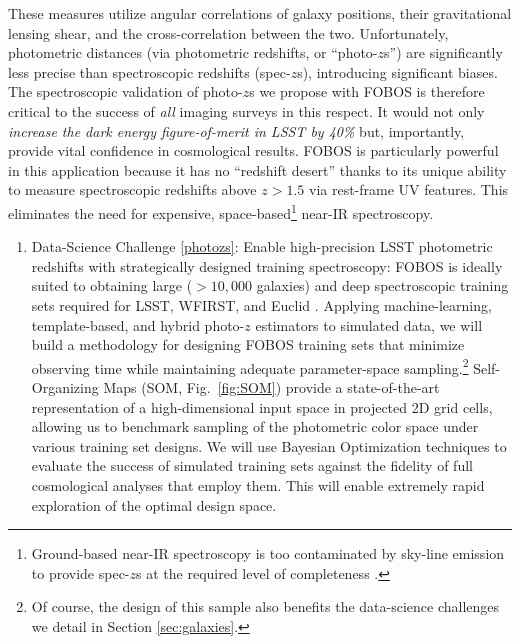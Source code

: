\documentclass[oneside,11pt]{amsart}
\newcounter{chalno}
\newcommand{\chal}[1]{\refstepcounter{chalno}\label{#1}}
\begin{document}
These measures utilize angular correlations of galaxy positions, their
gravitational lensing shear, and the cross-correlation between the two.
Unfortunately, photometric distances (via photometric redshifts, or
``photo-$z$s'') are significantly less precise than spectroscopic
redshifts (spec-$z$s), introducing significant biases.  The
spectroscopic validation of photo-$z$s we propose with FOBOS is
therefore critical to the success of {\it all} imaging surveys in this
respect. It would not only \emph{increase the dark energy
figure-of-merit in LSST by 40\%} \citep{newman15} but, importantly,
provide vital confidence in cosmological results.  FOBOS is particularly
powerful in this application because it has no ``redshift desert'' thanks to its unique ability to measure spectroscopic redshifts above $z > 1.5$ via
rest-frame UV features.  This eliminates the need for expensive, space-based\footnote{Ground-based near-IR
spectroscopy is too contaminated by sky-line emission to provide spec-$z$s at the required level of completeness
\citep{newman15}.} near-IR spectroscopy.

\chal{photozs}
%
\begin{enumerate}[rightmargin=0.2cm,leftmargin=0.2cm]
%
\item[] {\textsf {\large Data-Science Challenge \ref{photozs}: Enable
high-precision LSST photometric redshifts with strategically designed
training spectroscopy:}}  FOBOS is ideally suited to obtaining large
($>10,000$ galaxies) and deep spectroscopic training sets required for
LSST, WFIRST, and Euclid \citep[see][] {newman15}.  Applying
machine-learning, template-based, and hybrid photo-$z$ estimators to
simulated data, we will build a methodology for designing FOBOS training
sets that minimize observing time while maintaining adequate
parameter-space sampling.\footnote{
%
Of course, the design of this sample also benefits the data-science
challenges we detail in Section \ref{sec:galaxies}.}
%
Self-Organizing Maps (SOM, Fig.~\ref {fig:SOM}) provide a
state-of-the-art representation of a high-dimensional input space in
projected 2D grid cells, allowing us to benchmark sampling of the
photometric color space under various training set designs.  We will use
Bayesian Optimization techniques to evaluate the success of simulated training sets against the fidelity of full  
cosmological analyses that employ them.  This will enable extremely rapid exploration of the
optimal design space.

\end{enumerate}
\end{document}
